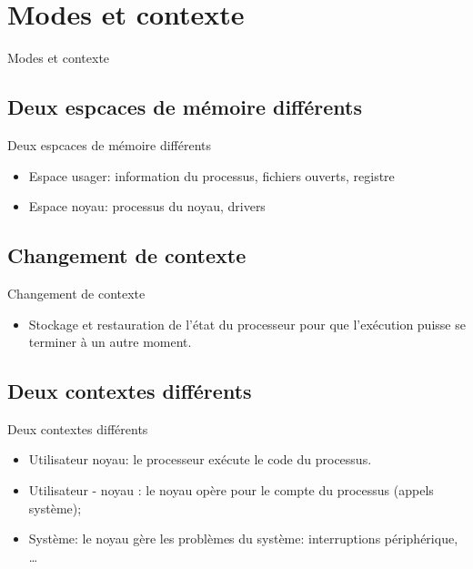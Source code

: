 \def\sectitle{Modes et contexte}
\section{\sectitle}

\begin{frame}{\sectitle}
\def\subsectitle{Deux espcaces de mémoire différents}
\subsection{\subsectitle}

\begin{block}{\subsectitle}
\begin{itemize}
    \item Espace usager: information du processus, fichiers ouverts, registre
    \item Espace noyau: processus du noyau, drivers
\end{itemize}
\end{block}


\def\subsectitle{Changement de contexte}
\subsection{\subsectitle}

\begin{alertblock}{\subsectitle}
\begin{itemize}
    \item Stockage et restauration de l'état du processeur pour que l'exécution
        puisse se terminer à un autre moment.
\end{itemize}
\end{alertblock}

\def\subsectitle{Deux contextes différents}
\subsection{\subsectitle}

\begin{block}{\subsectitle}
\begin{itemize}
    \item Utilisateur noyau: le processeur exécute le code du processus.
    \item Utilisateur - noyau : le noyau opère pour le compte du processus
        (appels système);
    \item Système: le noyau gère les problèmes du système: interruptions
    périphérique, \dots
\end{itemize}
\end{block}
\end{frame}

